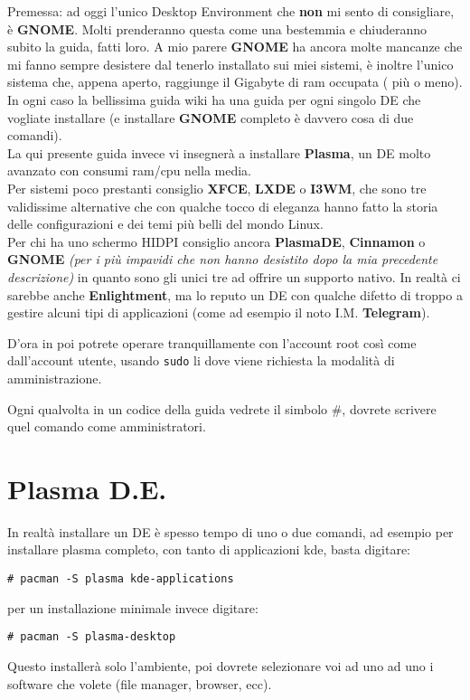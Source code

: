 \documentclass[twoside,italian]{book}
\newcommand{\code}[1]{\texttt{#1}}
\newcommand{\centcode}[1]{

\definecolor{codice}{rgb}{0.5,0.1,0.1}

	\begin{center}
		\color{codice}
		\code{#1}
	\end{center}


}
\newcommand{\nlinea}{
	\leavevmode
	\\
}
\begin{document}
		Premessa: ad oggi l'unico Desktop Environment che \textbf{non} mi sento di consigliare, è \textbf{GNOME}. Molti prenderanno questa come una bestemmia e chiuderanno subito la guida, fatti loro. A mio parere \textbf{GNOME} ha ancora molte mancanze che mi fanno sempre desistere dal tenerlo installato sui miei sistemi, è inoltre l'unico sistema che, appena aperto, raggiunge il Gigabyte di ram occupata ( più o meno). In ogni caso la bellissima guida wiki ha una guida per ogni singolo DE che vogliate installare (e installare \textbf{GNOME} completo è davvero cosa di due comandi).\\
		La qui presente guida invece vi insegnerà a installare \textbf{Plasma}, un DE molto avanzato con consumi ram/cpu nella media.\\ Per sistemi poco prestanti consiglio \textbf{XFCE}, \textbf{LXDE} o \textbf{I3WM}, che sono tre validissime alternative che con qualche tocco di eleganza hanno fatto la storia delle configurazioni e dei temi più belli del mondo Linux.\\
		 Per chi ha uno schermo HIDPI consiglio ancora \textbf{PlasmaDE}, \textbf{Cinnamon} o \textbf{GNOME} \textit{(per i più impavidi che non hanno desistito dopo la mia precedente descrizione)} in quanto sono gli unici tre ad offrire un supporto nativo. In realtà ci sarebbe anche \textbf{Enlightment}, ma lo reputo un DE con qualche difetto di troppo a gestire alcuni tipi di applicazioni (come ad esempio il noto I.M. \textbf{Telegram}).
		 
		 \begin{tcolorbox}[floatplacement=b,width=\textwidth,colback={blue},title={NOTA BENE:},colbacktitle=gray,coltitle=white,colupper=white]
		 	D'ora in poi potrete operare tranquillamente con l'account root così come dall'account utente, usando \code{sudo} li dove viene richiesta la modalità di amministrazione.
		 	
		 	Ogni qualvolta in un codice della guida vedrete il simbolo \#, dovrete scrivere quel comando come amministratori.
		 \end{tcolorbox}
	
		 \section{Plasma D.E.}
	
		 	In realtà installare un DE è spesso tempo di uno o due comandi, ad esempio per installare plasma completo, con tanto di applicazioni kde, basta digitare:\\
		 	\centcode{\# pacman -S plasma kde-applications }
		 	per un installazione minimale invece digitare:\centcode{\# pacman -S plasma-desktop}Questo installerà solo l'ambiente, poi dovrete selezionare voi ad uno ad uno i software che volete (file manager, browser, ecc).\\
		 	\nlinea
	
\end{document}
